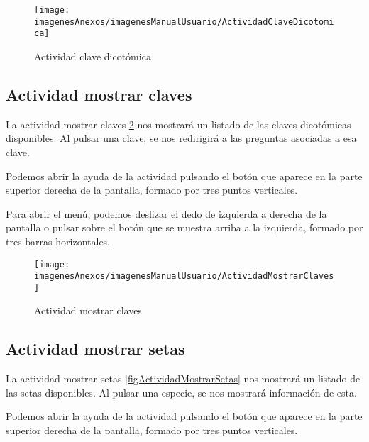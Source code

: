 \begin{figure}[h]
    \begin{center}%
        \begin{center}%
          \texttt{[image: imagenesAnexos/imagenesManualUsuario/ActividadClaveDicotomica]}%
          \caption{Actividad clave dicotómica}%
          \label{figActividadClaveDicotomica}%
        \end{center}%
  	\end{center}%
\end{figure}%
\newpage

\subsection{Actividad mostrar claves}

La actividad mostrar claves \ref{figActividadMostrarClaves} nos mostrará un listado de las claves dicotómicas disponibles. Al pulsar una clave, se nos redirigirá a las preguntas asociadas a esa clave.

Podemos abrir la ayuda de la actividad pulsando el botón que aparece en la parte superior derecha de la pantalla, formado por tres puntos verticales.

Para abrir el menú, podemos deslizar el dedo de izquierda a derecha de la pantalla o pulsar sobre el botón que se muestra arriba a la izquierda, formado por tres barras horizontales.

\begin{figure}[h]
    \begin{center}%
        \begin{center}%
          \texttt{[image: imagenesAnexos/imagenesManualUsuario/ActividadMostrarClaves]}%
          \caption{Actividad mostrar claves}%
          \label{figActividadMostrarClaves}%
        \end{center}%
  	\end{center}%
\end{figure}%
\newpage

\subsection{Actividad mostrar setas}

La actividad mostrar setas \ref{figActividadMostrarSetas} nos mostrará un listado de las setas disponibles. Al pulsar una especie, se nos mostrará información de esta.

Podemos abrir la ayuda de la actividad pulsando el botón que aparece en la parte superior derecha de la pantalla, formado por tres puntos verticales.

